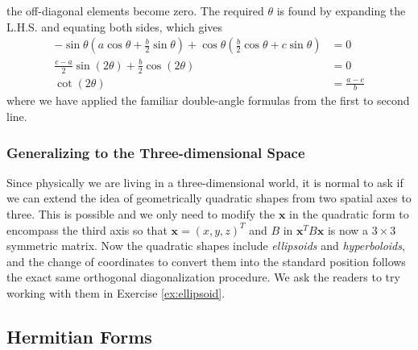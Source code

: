 the off-diagonal elements become zero. The required $\theta$ is found by expanding the L.H.S. and equating both sides, which gives
\begin{align}
-\sin \theta (a \cos\theta + \frac{b}{2}\sin \theta) + \cos\theta (\frac{b}{2} \cos \theta + c\sin \theta) &= 0 \nonumber \\
\frac{c-a}{2} \sin (2\theta) + \frac{b}{2}\cos(2\theta) &= 0 \nonumber \\
\cot(2\theta) &= \frac{a-c}{b} \label{eqn:rotate2dquad}
\end{align}
where we have applied the familiar double-angle formulas from the first to second line.

\subsubsection{Generalizing to the Three-dimensional Space}
Since physically we are living in a three-dimensional world, it is normal to ask if we can extend the idea of geometrically quadratic shapes from two spatial axes to three. This is possible and we only need to modify the $\textbf{x}$ in the quadratic form to encompass the third axis so that $\textbf{x} = (x,y,z)^T$ and $B$ in $\textbf{x}^TB\textbf{x}$ is now a $3 \times 3$ symmetric matrix. Now the quadratic shapes include \textit{ellipsoids} and \textit{hyperboloids}, and the change of coordinates to convert them into the standard position follows the exact same orthogonal diagonalization procedure. We ask the readers to try working with them in Exercise \ref{ex:ellipsoid}.

\subsection{Hermitian Forms}
\label{section:hermform}

